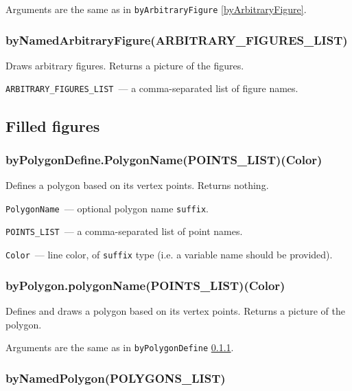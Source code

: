 	Arguments are the same as in \texttt{byArbitraryFigure} \ref{byArbitraryFigure}.

\subsubsection{byNamedArbitraryFigure(ARBITRARY\_FIGURES\_LIST)}\label{byNamedArbitraryFigure}

	Draws arbitrary figures. Returns a picture of the figures.
	
	\texttt{ARBITRARY\_FIGURES\_LIST}~— a comma-separated list of figure names.


\subsection{Filled figures}


\subsubsection{byPolygonDefine.PolygonName(POINTS\_LIST)(Color)}\label{byPolygonDefine}

	Defines a polygon based on its vertex points. Returns nothing.
	
	\texttt{PolygonName}~— optional polygon name \texttt{suffix}.
	
	\texttt{POINTS\_LIST}~— a comma-separated list of point names.
	
	\texttt{Color}~— line color, of \texttt{suffix} type (i.e. a variable name should be provided).


\subsubsection{byPolygon.polygonName(POINTS\_LIST)(Color)}\label{byPolygon}

	Defines and draws a polygon based on its vertex points. Returns a picture of the polygon.
	
	Arguments are the same as in \texttt{byPolygonDefine} \ref{byPolygonDefine}.



\subsubsection{byNamedPolygon(POLYGONS\_LIST)}\label{byNamedPolygon}
	
